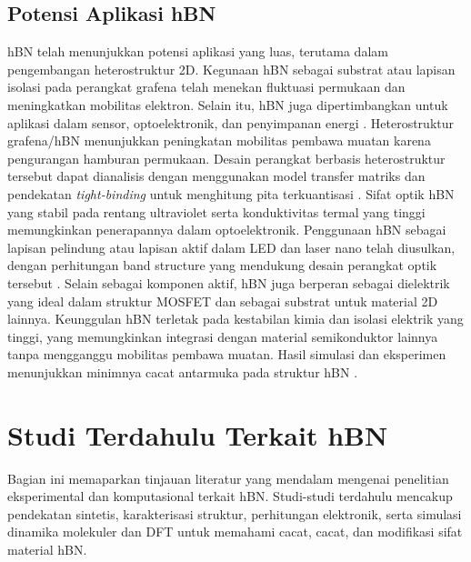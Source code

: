 \subsection{Potensi Aplikasi hBN}
hBN telah menunjukkan potensi aplikasi yang luas, terutama dalam pengembangan heterostruktur 2D.
Kegunaan hBN sebagai substrat atau lapisan isolasi pada perangkat grafena telah menekan fluktuasi permukaan dan meningkatkan mobilitas elektron.
Selain itu, hBN juga dipertimbangkan untuk aplikasi dalam sensor, optoelektronik, dan penyimpanan energi \citep{Wang2017}.
Heterostruktur grafena/hBN menunjukkan peningkatan mobilitas pembawa muatan karena pengurangan hamburan permukaan.
Desain perangkat berbasis heterostruktur tersebut dapat dianalisis dengan menggunakan model transfer matriks dan pendekatan \emph{tight-binding} untuk menghitung pita terkuantisasi \citep{CastroNeto2009}.
Sifat optik hBN yang stabil pada rentang ultraviolet serta konduktivitas termal yang tinggi memungkinkan penerapannya dalam optoelektronik.
Penggunaan hBN sebagai lapisan pelindung atau lapisan aktif dalam LED dan laser nano telah diusulkan, dengan perhitungan band structure yang mendukung desain perangkat optik tersebut \citep{Zhang2020}.
Selain sebagai komponen aktif, hBN juga berperan sebagai dielektrik yang ideal dalam struktur MOSFET dan sebagai substrat untuk material 2D lainnya.
Keunggulan hBN terletak pada kestabilan kimia dan isolasi elektrik yang tinggi, yang memungkinkan integrasi dengan material semikonduktor lainnya tanpa mengganggu mobilitas pembawa muatan.
Hasil simulasi dan eksperimen menunjukkan minimnya cacat antarmuka pada struktur hBN \citep{Bhimanapati2016}.

\section{Studi Terdahulu Terkait hBN}
Bagian ini memaparkan tinjauan literatur yang mendalam mengenai penelitian eksperimental dan komputasional terkait hBN.
Studi-studi terdahulu mencakup pendekatan sintetis, karakterisasi struktur, perhitungan elektronik, serta simulasi dinamika molekuler dan DFT untuk memahami cacat, cacat, dan modifikasi sifat material hBN.

